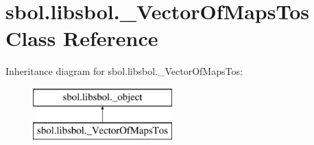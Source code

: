 \hypertarget{classsbol_1_1libsbol_1_1___vector_of_maps_tos}{}\section{sbol.\+libsbol.\+\_\+\+Vector\+Of\+Maps\+Tos Class Reference}
\label{classsbol_1_1libsbol_1_1___vector_of_maps_tos}
Inheritance diagram for sbol.\+libsbol.\+\_\+\+Vector\+Of\+Maps\+Tos\+:\begin{figure}[H]
\begin{center}
\leavevmode
\includegraphics[height=2.000000cm]{classsbol_1_1libsbol_1_1___vector_of_maps_tos}
\end{center}
\end{figure}
